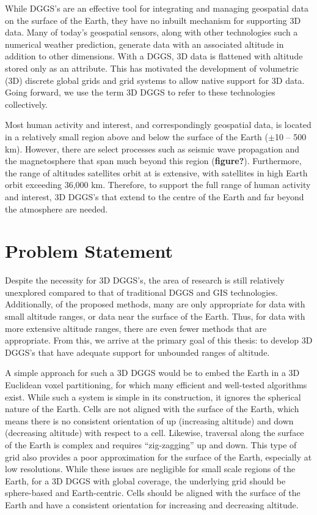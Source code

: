 While DGGS's are an effective tool for integrating and managing geospatial data on the surface of the Earth, they have no inbuilt mechanism for supporting 3D data.
Many of today's geospatial sensors, along with other technologies such a numerical weather prediction, generate data with an associated altitude in addition to other dimensions.
With a DGGS, 3D data is flattened with altitude stored only as an attribute.
This has motivated the development of volumetric (3D) discrete global grids and grid systems to allow native support for 3D data.
Going forward, we use the term 3D DGGS to refer to these technologies collectively.


Most human activity and interest, and correspondingly geospatial data, is located in a relatively small region above and below the surface of the Earth ($\pm$10 -- 500 km).
However, there are select processes such as seismic wave propagation and the magnetosphere that span much beyond this region (\textbf{figure?}).
Furthermore, the range of altitudes satellites orbit at is extensive, with satellites in high Earth orbit exceeding 36,000 km.
Therefore, to support the full range of human activity and interest, 3D DGGS's that extend to the centre of the Earth and far beyond the atmosphere are needed.


\section{Problem Statement}
Despite the necessity for 3D DGGS's, the area of research is still relatively unexplored compared to that of traditional DGGS and GIS technologies.
Additionally, of the proposed methods, many are only appropriate for data with small altitude ranges, or data near the surface of the Earth.
Thus, for data with more extensive altitude ranges, there are even fewer methods that are appropriate. 
From this, we arrive at the primary goal of this thesis: to develop 3D DGGS's that have adequate support for unbounded ranges of altitude. 


A simple approach for such a 3D DGGS would be to embed the Earth in a 3D Euclidean voxel partitioning, for which many efficient and well-tested algorithms exist.
While such a system is simple in its construction, it ignores the spherical nature of the Earth.
Cells are not aligned with the surface of the Earth, which means there is no consistent orientation of up (increasing altitude) and down (decreasing altitude) with respect to a cell.
Likewise, traversal along the surface of the Earth is complex and requires ``zig-zagging'' up and down.
This type of grid also provides a poor approximation for the surface of the Earth, especially at low resolutions.
While these issues are negligible for small scale regions of the Earth, for a 3D DGGS with global coverage, the underlying grid should be sphere-based and Earth-centric.
Cells should be aligned with the surface of the Earth and have a consistent orientation for increasing and decreasing altitude.


